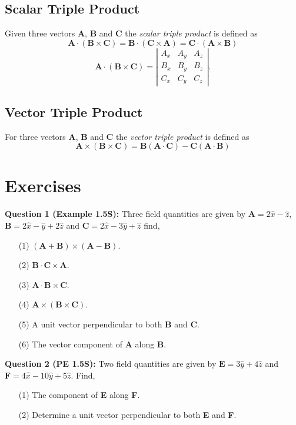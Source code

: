 \documentclass[12pt,a4paper]{article}
\begin{document}
\subsection{Scalar Triple Product}
Given three vectors \textbf{A}, \textbf{B} and \textbf{C} the \textit{scalar triple product} is defined as
\begin{equation}
\textbf{A}\cdot (\textbf{B}\times \textbf{C})=\textbf{B}\cdot (\textbf{C}\times \textbf{A})=\textbf{C}\cdot (\textbf{A}\times \textbf{B})
\end{equation}
\begin{equation}
\textbf{A}\cdot (\textbf{B}\times \textbf{C})=\left| \begin{array}{ccc} A_x & A_y & A_z\\ B_x & B_y & B_z\\ C_x & C_y & C_z \end{array} \right|.
\end{equation}
\subsection{Vector Triple Product}
For three vectors \textbf{A}, \textbf{B} and \textbf{C} the \textit{vector triple product} is defined as
\begin{equation}
\textbf{A}\times (\textbf{B}\times \textbf{C})=\textbf{B}(\textbf{A}\cdot \textbf{C})-\textbf{C} (\textbf{A}\cdot \textbf{B})
\end{equation}

\section{Exercises}
\noindent\textbf{Question 1 (Example 1.5S):} Three field quantities are given by $\textbf{A}=2\hat x-\hat z$, $\textbf{B}=2\hat x-\hat y+2\hat z$ and $\textbf{C}=2\hat x-3\hat y+\hat z$ find,
\begin{enumerate}
\item[(1)] $(\textbf{A}+\textbf{B})\times(\textbf{A}-\textbf{B})$.
\item[(2)] $\textbf{B}\cdot \textbf{C}\times \textbf{A}$.
\item[(3)] $\textbf{A}\cdot \textbf{B}\times \textbf{C}$.
\item[(4)] $\textbf{A}\times(\textbf{B}\times \textbf{C})$.
\item[(5)] A unit vector perpendicular to both \textbf{B} and \textbf{C}.
\item[(6)] The vector component of \textbf{A} along \textbf{B}.
\end{enumerate}
\noindent\textbf{Question 2 (PE 1.5S):} Two field quantities are given by $\textbf{E}=3\hat y+4\hat z$ and $\textbf{F}=4\hat x-10\hat y+5\hat z$. Find,
\begin{enumerate}
\item[(1)] The component of \textbf{E} along \textbf{F}.
\item[(2)] Determine a unit vector perpendicular to both \textbf{E} and \textbf{F}.
\end{enumerate}


\end{document}
